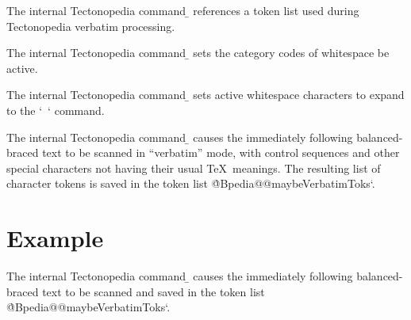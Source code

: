 
The internal Tectonopedia command \b{\string\pedia@maybeVerbatimToks} references
a token list used during Tectonopedia verbatim processing.



The internal Tectonopedia command \b{\string\pedia@makeActiveWhitespace} sets
the category codes of whitespace be active.



The internal Tectonopedia command \b{\string\pedia@defineActiveWhitespace} sets
active whitespace characters to expand to the \tex`\ ` command.



The internal Tectonopedia command \b{\string\pediaScanVerbatim} causes the
immediately following balanced-braced text to be scanned in “verbatim” mode,
with control sequences and other special characters not having their usual \TeX\
meanings. The resulting list of character tokens is saved in the token list
\`@Bpedia@@maybeVerbatimToks`.

\section*{Example}

\begin{texdisp}
\pediaScanVerbatim{\hello$_$}
\makeatletter
\the\pedia@maybeVerbatimToks %
\makeatother
\end{texdisp}


\DeclareTerm*{\string\pediaPassOneVerbatim}{@BpediaPassOneVerbatim}

The internal Tectonopedia command \b{\string\pediaPassOneVerbatim} causes the
immediately following balanced-braced text to be scanned and saved in the token
list \`@Bpedia@@maybeVerbatimToks`.


